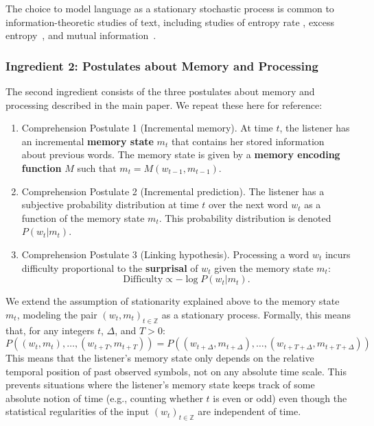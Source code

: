 \documentclass[11pt,letterpaper]{article}
\newcommand\mhahn[1]{{\color{red}(#1)}}
\newcommand{\key}[1]{\textbf{#1}}
\begin{document}

The choice to model language as a stationary stochastic process is common to information-theoretic studies of text, including studies of entropy rate \citep{shannon1951entropy,bentz2017entropy,takahashi2018cross}, excess entropy~\citep{debowski-excess-2011,hahn2019estimating}, and mutual information~\citep{ebeling-entropy-1994,lin-critical-2017}.

\subsubsection{Ingredient 2: Postulates about Memory and Processing}
The second ingredient consists of the three postulates about memory and processing described in the main paper.
We repeat these here for reference:
\begin{enumerate}
    \item Comprehension Postulate 1 (Incremental memory). At time $t$, the listener has an incremental \key{memory state} $m_t$ that contains her stored information about previous words. The memory state is given by a \key{memory encoding function} $M$ such that $m_t = M(w_{t-1}, m_{t-1})$.
    \item Comprehension Postulate 2 (Incremental prediction). The listener has a subjective probability distribution at time $t$ over the next word $w_t$ as a function of the memory state $m_t$. This probability distribution is denoted $P(w_t|m_t)$.
    \item Comprehension Postulate 3 (Linking hypothesis). Processing a word $w_t$ incurs difficulty proportional to the \key{surprisal} of $w_t$ given the memory state $m_t$:
    \begin{equation}
    \label{eq:lossy-surp}
    \text{Difficulty} \propto -\log P(w_t | m_t).
\end{equation}
\end{enumerate}
We extend the assumption of stationarity explained above to the memory state $m_t$, modeling the pair $(w_t, m_t)_{t \in \mathbb{Z}}$ as a stationary process.
Formally, this means that, for any integers $t$, $\Delta$, and $T>0$:
\begin{equation}
	P((w_t, m_t), \dots, (w_{t+T}, m_{t+T})) = 	P((w_{t+\Delta}, m_{t+\Delta}), \dots, (w_{t+T+\Delta}, m_{t+T+\Delta}))
\end{equation}
This means that the listener's memory state only depends on the relative temporal position of past observed symbols, not on any absolute time scale.
This prevents situations where the listener's memory state keeps track of some absolute notion of time (e.g., counting whether $t$ is even or odd) even though the statistical regularities of the input $(w_t)_{t \in \mathbb{Z}}$ are independent of time.
\end{document}
